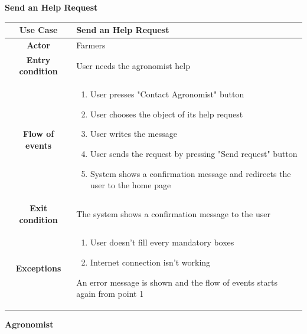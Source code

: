 \documentclass[table, 12pt]{article}
\begin{document}
\begin{itemize}
            \begin{table}[H]
                \item[] \textbf{Send an Help Request}
                \item[] 
                \centering
                \begin{tabular}{|c |m{}|}
                    \hline
                    \textbf{Use Case} & Send an Help Request\\ \hline
                    \textbf{Actor} & Farmers\\ \hline
                    \textbf{Entry condition} & User needs the agronomist help\\  \hline
                    \textbf{Flow of events} & \begin{enumerate}
                                                \item User presses "Contact Agronomist" button
                                                \item User chooses the object of its help request
                                                \item User writes the message
                                                \item User sends the request by pressing "Send request" button
                                                \item System shows a confirmation message and redirects the user to the home page 
                                            \end{enumerate}\\ \hline
                    \textbf{Exit condition} & The system shows a confirmation message to the user \\ \hline
                    \textbf{Exceptions} &  \begin{enumerate}
                        \item User doesn't fill every mandatory boxes
                        \item Internet connection isn't working 
                    \end{enumerate}
                    An error message is shown and the flow of events starts again from point 1\\ \hline                    
                \end{tabular}
            \end{table}

            \newpage
            \item \textbf{Agronomist}
            

\end{itemize}
\end{document}
